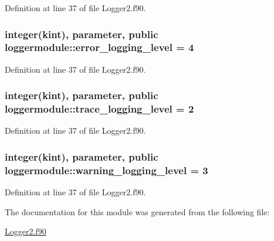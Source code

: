 Definition at line 37 of file Logger2.\+f90.

\hypertarget{classloggermodule_a1d52449f4ca792db29474f53836a6cc9}{
\subsubsection[{error\+\_\+logging\+\_\+level}]{\setlength{\rightskip}{0pt plus 5cm}integer(kint), parameter, public loggermodule\+::error\+\_\+logging\+\_\+level = 4}}\label{classloggermodule_a1d52449f4ca792db29474f53836a6cc9}


Definition at line 37 of file Logger2.\+f90.

\hypertarget{classloggermodule_adb73c4aacaf084ae41abab66967cf5ca}{
\subsubsection[{trace\+\_\+logging\+\_\+level}]{\setlength{\rightskip}{0pt plus 5cm}integer(kint), parameter, public loggermodule\+::trace\+\_\+logging\+\_\+level = 2}}\label{classloggermodule_adb73c4aacaf084ae41abab66967cf5ca}


Definition at line 37 of file Logger2.\+f90.

\hypertarget{classloggermodule_a81b6e629b304bffe7abdd8de4a80e18e}{
\subsubsection[{warning\+\_\+logging\+\_\+level}]{\setlength{\rightskip}{0pt plus 5cm}integer(kint), parameter, public loggermodule\+::warning\+\_\+logging\+\_\+level = 3}}\label{classloggermodule_a81b6e629b304bffe7abdd8de4a80e18e}


Definition at line 37 of file Logger2.\+f90.



The documentation for this module was generated from the following file\+:\begin{DoxyCompactItemize}
\item 
\hyperlink{Logger2_8f90}{Logger2.\+f90}\end{DoxyCompactItemize}
